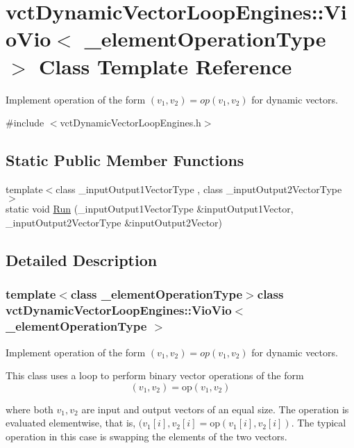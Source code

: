 \hypertarget{classvct_dynamic_vector_loop_engines_1_1_vio_vio}{\section{vct\-Dynamic\-Vector\-Loop\-Engines\-:\-:Vio\-Vio$<$ \-\_\-element\-Operation\-Type $>$ Class Template Reference}
\label{classvct_dynamic_vector_loop_engines_1_1_vio_vio}
}


Implement operation of the form $(v_{1}, v_{2}) = op(v_{1}, v_{2})$ for dynamic vectors.  




{\ttfamily \#include $<$vct\-Dynamic\-Vector\-Loop\-Engines.\-h$>$}

\subsection*{Static Public Member Functions}
\begin{DoxyCompactItemize}
\item 
{\footnotesize template$<$class \-\_\-input\-Output1\-Vector\-Type , class \-\_\-input\-Output2\-Vector\-Type $>$ }\\static void \hyperlink{classvct_dynamic_vector_loop_engines_1_1_vio_vio_a68c04111eec38d9a4f0d6c416e65540b}{Run} (\-\_\-input\-Output1\-Vector\-Type \&input\-Output1\-Vector, \-\_\-input\-Output2\-Vector\-Type \&input\-Output2\-Vector)
\end{DoxyCompactItemize}


\subsection{Detailed Description}
\subsubsection*{template$<$class \-\_\-element\-Operation\-Type$>$class vct\-Dynamic\-Vector\-Loop\-Engines\-::\-Vio\-Vio$<$ \-\_\-element\-Operation\-Type $>$}

Implement operation of the form $(v_{1}, v_{2}) = op(v_{1}, v_{2})$ for dynamic vectors. 

This class uses a loop to perform binary vector operations of the form \[ (v_{1}, v_{2}) = \mathrm{op}(v_{1}, v_{2}) \]

where both $v_{1}, v_{2}$ are input and output vectors of an equal size. The operation is evaluated elementwise, that is, $(v_{1}[i], v_{2}[i] = \mathrm{op}(v_{1}[i], v_{2}[i])$. The typical operation in this case is swapping the elements of the two vectors.


